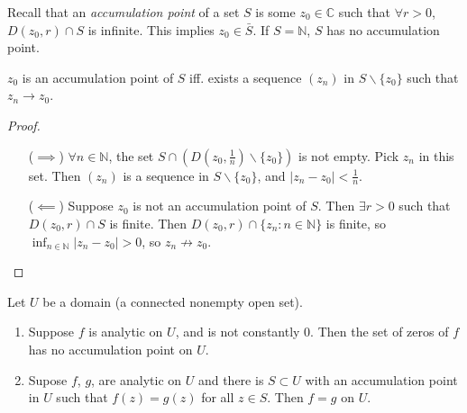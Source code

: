 Recall that an \emph{accumulation point} of a set $S$ is some
$z_0 \in \mathbb{C}$ such that $\forall r > 0$,
$D(z_0, r) \cap S$ is infinite. This implies $z_0 \in \bar{S}$.
If $S = \mathbb{N}$, $S$ has no accumulation point.

\begin{lemma}
  $z_0$ is an accumulation point of $S$ iff. exists a
  sequence $(z_n)$ in $S \backslash \{ z_0 \}$ such that $z_n \to z_0$.
\end{lemma}

\begin{proof}
  \begin{itemize}
    \item[($\implies$)]{
      $\forall n \in \mathbb{N}$, the set
      $S \cap (D(z_0, \frac{1}{n}) \backslash \{ z_0 \})$ is not empty.
      Pick $z_n$ in this set. Then $(z_n)$ is a sequence in
      $S \backslash \{z_0\}$, and $|z_n - z_0| < \frac{1}{n}$.
    }
    \item[($\impliedby$)]{
      Suppose $z_0$ is not an accumulation point of $S$. Then
      $\exists r > 0$ such that $D(z_0, r) \cap S$ is finite.
      Then $D(z_0, r) \cap \{ z_n : n \in \mathbb{N} \}$ is
      finite, so $\inf_{n \in \mathbb{N}} |z_n - z_0| > 0$,
      so $z_n {\not \to} z_0$.
    }
  \end{itemize}
\end{proof}

\begin{theorem}
  Let $U$ be a domain (a connected nonempty open set).
  \begin{enumerate}[label=(\alph*)]
    \item{
      Suppose $f$ is analytic on $U$, and is not constantly 0.
      Then the set of zeros of $f$ has no accumulation point on $U$.
    }
    \item{
      Supose $f$, $g$, are analytic on $U$ and there is $S \subset U$
      with an accumulation point in $U$ such that $f(z) = g(z)$
      for all $z \in S$. Then $f = g$ on $U$.
    }
  \end{enumerate}
\end{theorem}

